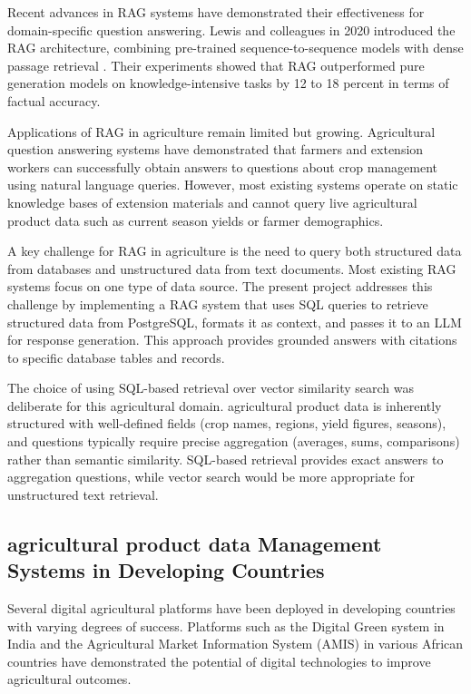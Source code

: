 Recent advances in RAG systems have demonstrated their effectiveness for domain-specific question answering. Lewis and colleagues in 2020 introduced the RAG architecture, combining pre-trained sequence-to-sequence models with dense passage retrieval \cite{lewis2020}. Their experiments showed that RAG outperformed pure generation models on knowledge-intensive tasks by 12 to 18 percent in terms of factual accuracy.

Applications of RAG in agriculture remain limited but growing. Agricultural question answering systems have demonstrated that farmers and extension workers can successfully obtain answers to questions about crop management using natural language queries. However, most existing systems operate on static knowledge bases of extension materials and cannot query live agricultural product data such as current season yields or farmer demographics.

A key challenge for RAG in agriculture is the need to query both structured data from databases and unstructured data from text documents. Most existing RAG systems focus on one type of data source. The present project addresses this challenge by implementing a RAG system that uses SQL queries to retrieve structured data from PostgreSQL, formats it as context, and passes it to an LLM for response generation. This approach provides grounded answers with citations to specific database tables and records.

The choice of using SQL-based retrieval over vector similarity search was deliberate for this agricultural domain. agricultural product data is inherently structured with well-defined fields (crop names, regions, yield figures, seasons), and questions typically require precise aggregation (averages, sums, comparisons) rather than semantic similarity. SQL-based retrieval provides exact answers to aggregation questions, while vector search would be more appropriate for unstructured text retrieval.

\subsection{agricultural product data Management Systems in Developing Countries}

Several digital agricultural platforms have been deployed in developing countries with varying degrees of success. Platforms such as the Digital Green system in India and the Agricultural Market Information System (AMIS) in various African countries have demonstrated the potential of digital technologies to improve agricultural outcomes.

